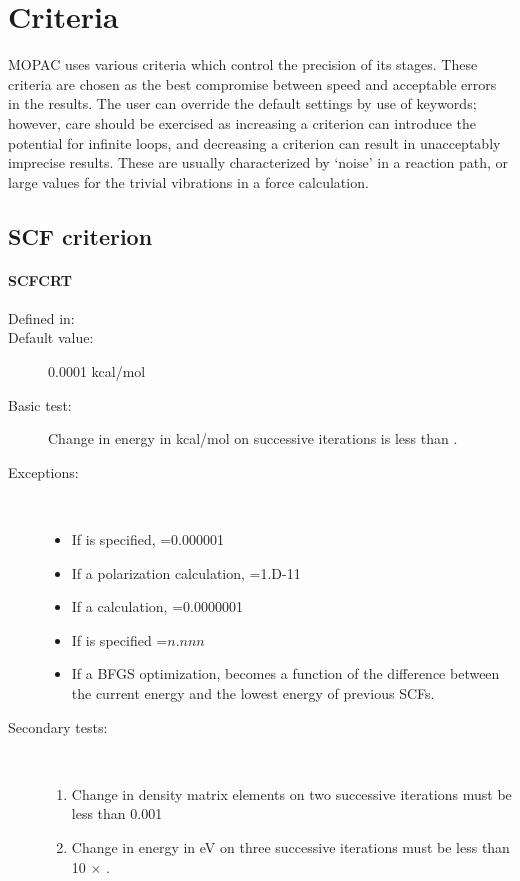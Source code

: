 \chapter{Criteria}\label{criteria}
MOPAC uses various criteria which  control  the  precision  of  its stages.  
These criteria are chosen as the best compromise between speed and acceptable
errors in the results.  The user can override the default settings  by  use 
of  keywords;  however,  care  should be exercised as increasing a criterion
can introduce the potential for  infinite  loops, and decreasing a criterion
can result in unacceptably imprecise results. These are usually characterized
by `noise' in a reaction path, or  large values for the trivial vibrations in a
force calculation.

\section{SCF criterion}
\subsubsection*{SCFCRT}
\begin{description}
\item[Defined in:] 
\item[Default value:] 0.0001 kcal/mol
\item[Basic test:] Change in energy in kcal/mol on successive iterations is 
less than .
\item[Exceptions:]~
\begin{itemize}
\item If  is specified, =0.000001
\item If a polarization calculation, =1.D-11
\item If a  calculation, =0.0000001
\item If  is specified =$n.nnn$
\item If a BFGS optimization,  becomes a function of the 
difference between the current energy and the lowest energy of previous SCFs.
\end{itemize}
\item[Secondary tests:]~
\begin{enumerate}
\item Change in density matrix elements on two successive iterations must be 
less than 0.001
\item Change in energy in eV on three successive iterations must be less than 
10 $\times$ .
\end{enumerate}
\end{description}

